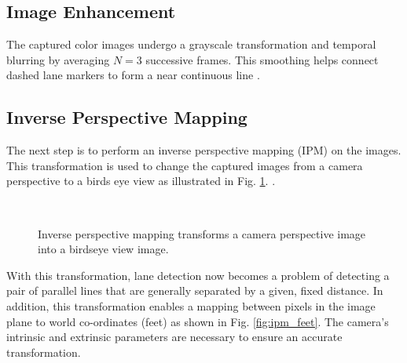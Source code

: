 \documentclass{article}
\begin{document}
\subsection{Image Enhancement}
The captured color images undergo a grayscale transformation and temporal blurring by averaging $N=3$ successive frames.  This smoothing helps connect dashed lane markers to form a near continuous line \cite{borkar_layered_2009}.
\subsection{Inverse Perspective Mapping}
The next step is to perform an inverse perspective mapping (IPM) on the images.  This transformation is used to change the captured images from a camera perspective to a birds eye view as illustrated in Fig. \ref{fig:ipm}.
\cite{sehestedt_robust_2007,shu_vision_2004,bertozzi_gold:parallel_1998}.
\begin{figure}[htb]
  \centering
    \hspace{0.00001in}
      \\
  \caption{Inverse perspective mapping transforms a camera perspective image into a birdseye view image.}
  \label{fig:ipm}
\end{figure}
With this transformation, lane detection now becomes a problem of detecting a pair of parallel lines that are generally separated by a given, fixed distance.
In addition, this transformation enables a mapping between pixels in the image plane to world co-ordinates (feet) as shown in Fig. \ref{fig:ipm_feet}. The camera's intrinsic and extrinsic parameters are necessary to ensure an accurate transformation.
\end{document}
